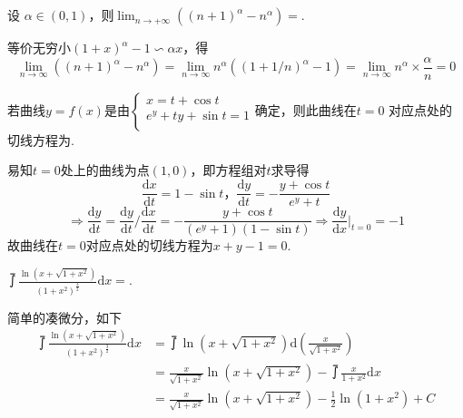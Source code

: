 \documentclass[hideanswer=false,
enfont=newtxtext,
zhfont=empty,
mathfont=newtxmath,
]{cmcthesis}
\begin{document}

\addvspace{1\bigskipamount}

\\\\
\wq 设 $\alpha\in\left(0,1\right)$，则$ \lim_{n\rightarrow +\infty}\left(\left(n+1\right)^{\alpha}-n^{\alpha}\right)=$\underline{\hspace{3em}}.\\
	\begin{answer}
	\begin{solution}
等价无穷小$\left(1+x\right)^{\alpha}-1\backsim\alpha x$，得
		\[
		\lim_{n\rightarrow\infty}\left(\left(n+1\right)^{\alpha}-n^{\alpha}\right)=\lim_{n\rightarrow\infty}n^{\alpha}\left(\left(1+1/n\right)^{\alpha}-1\right)=\lim_{n\rightarrow\infty}n^{\alpha}\times\frac{\alpha}{n}=0
		\]
	\end{solution}
	\end{answer}
\wq $\textrm{若曲线}y=f\left(x\right)\textrm{是由}\left\{\begin{array}{l}
x=t+\cos t\\
e^y+ty+\sin t=1\\
\end{array}\right.\textrm{确定，则此曲线在}t=0$ 对应点处的\\
切线方程为\underline{\hspace{3em}}.\\
	\begin{answer}
	\begin{solution}
易知$t=0$处上的曲线为点$(1,0)$，即方程组对$t$求导得
\[
\frac{\mathrm{d}x}{\mathrm{d}t}=1-\sin t\textbf{，}\frac{\mathrm{d}y}{\mathrm{d}t}=-\frac{y+\cos t}{e^y+t}
\]
\[
\Rightarrow\frac{\mathrm{d}y}{\mathrm{d}t}=\frac{\mathrm{d}y}{\mathrm{d}t}/\frac{\mathrm{d}x}{\mathrm{d}t}=-\frac{y+\cos t}{\left(e^y+1\right)\left(1-\sin t\right)}\Rightarrow\frac{\mathrm{d}y}{\mathrm{d}x}|_{t=0}=-1
\]
故曲线在$t=0$对应点处的切线方程为$x+y-1=0$.
	\end{solution}
	\end{answer}

\wq $\upint{\frac{\ln\left(x+\sqrt{1+x^2}\right)}{\left(1+x^2\right)^{\frac{3}{2}}}}\mathrm{d}x=$\underline{\hspace{3em}}.\\
	\begin{answer}
	\begin{solution}
简单的凑微分，如下
\begin{align*}
\upint{\frac{\ln\left(x+\sqrt{1+x^2}\right)}{\left(1+x^2\right)^{\frac{3}{2}}}}\mathrm{d}x&=\upint{\ln\left(x+\sqrt{1+x^2}\right)}\mathrm{d}\left(\frac{x}{\sqrt{1+x^2}}\right)\\
&=\frac{x}{\sqrt{1+x^2}}\ln\left(x+\sqrt{1+x^2}\right)-\upint{\frac{x}{1+x^2}\mathrm{d}x}\\
&=\frac{x}{\sqrt{1+x^2}}\ln\left(x+\sqrt{1+x^2}\right)-\frac{1}{2}\ln\left(1+x^2\right)+C
\end{align*}
	\end{solution}
	\end{answer}
\end{document}
